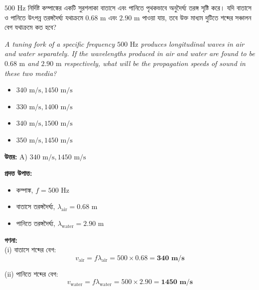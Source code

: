 \documentclass[12pt, a4paper]{article}
\begin{document}
\begin{tcolorbox}[questionbox={প্রশ্ন (Question) 2}]
    \noindent
    $500\text{ Hz}$ নির্দিষ্ট কম্পাঙ্কের একটি সুরশলাকা বাতাসে এবং পানিতে পৃথকভাবে অনুদৈর্ঘ্য তরঙ্গ সৃষ্টি করে। যদি বাতাসে ও পানিতে উৎপন্ন তরঙ্গদৈর্ঘ্য যথাক্রমে $0.68\text{ m}$ এবং $2.90\text{ m}$ পাওয়া যায়, তবে উক্ত মাধ্যম দুটিতে শব্দের সঞ্চালন বেগ যথাক্রমে কত হবে?
    
    \vspace{0.8em}
    \begin{english}
    \noindent\textit{\color{darkgray}
    A tuning fork of a specific frequency $500\text{ Hz}$ produces longitudinal waves in air and water separately. If the wavelengths produced in air and water are found to be $0.68\text{ m}$ and $2.90\text{ m}$ respectively, what will be the propagation speeds of sound in these two media?
    }
    \end{english}
\end{tcolorbox}

\begin{itemize}[label={}, leftmargin=1cm, itemsep=0.5em]
    \item[\textbf{A)}] $340\text{ m/s}, 1450\text{ m/s}$
    \item[\textbf{B)}] $330\text{ m/s}, 1400\text{ m/s}$
    \item[\textbf{C)}] $340\text{ m/s}, 1500\text{ m/s}$
    \item[\textbf{D)}] $350\text{ m/s}, 1450\text{ m/s}$
\end{itemize}

\vspace{0.5em}
\begin{tcolorbox}[answerbox]
    \textbf{\color{success} উত্তর:} A) $340\text{ m/s}, 1450\text{ m/s}$
\end{tcolorbox}
\vspace{1em}

\begin{tcolorbox}[solutionbox={সমাধান (Solution)}]
    \noindent
    \textbf{প্রদত্ত উপাত্ত:}
    \begin{itemize}[leftmargin=1.5em, itemsep=0.2em]
        \item কম্পাঙ্ক, $f = 500\text{ Hz}$
        \item বাতাসে তরঙ্গদৈর্ঘ্য, $\lambda_{\text{air}} = 0.68\text{ m}$
        \item পানিতে তরঙ্গদৈর্ঘ্য, $\lambda_{\text{water}} = 2.90\text{ m}$
    \end{itemize}

    \vspace{0.6em}
    \noindent\textbf{গণনা:} \\
    (i) বাতাসে শব্দের বেগ:
    \[ v_{\text{air}} = f \lambda_{\text{air}} = 500 \times 0.68 = \mathbf{340\text{ m/s}} \]
    
    (ii) পানিতে শব্দের বেগ:
    \[ v_{\text{water}} = f \lambda_{\text{water}} = 500 \times 2.90 = \mathbf{1450\text{ m/s}} \]
\end{tcolorbox}
\end{document}
